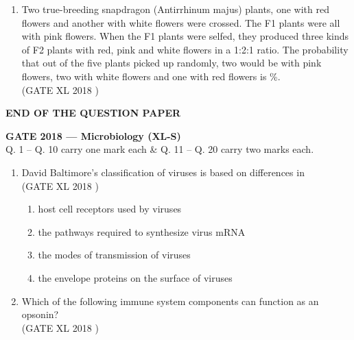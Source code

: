 \documentclass[14pt]{extarticle}
\begin{document}
\begin{flushleft}
\begin{enumerate}[leftmargin=*]
    \item Two true-breeding snapdragon (Antirrhinum majus) plants, one with red flowers and another with white flowers were crossed. The F1 plants were all with pink flowers. When the F1 plants were selfed, they produced three kinds of F2 plants with red, pink and white flowers in a 1:2:1 ratio. The probability that out of the five plants picked up randomly, two would be with pink flowers, two with white flowers and one with red flowers is \underline{\hspace{3cm}} \%.\\
    \hfill(GATE XL 2018 )
\end{enumerate}
\begin{center}
    \textbf{END OF THE QUESTION PAPER}
\end{center}
\clearpage

\begin{center}
 \textbf{\large{GATE 2018 — Microbiology (XL-S)}}\\[6pt]
 Q. 1 -- Q. 10 carry one mark each \& Q. 11 -- Q. 20 carry two marks each.\\[12pt]
\end{center}

\begin{enumerate}

\item David Baltimore’s classification of viruses is based on differences in\\
\hfill(GATE XL 2018 )\\
\begin{enumerate}
  \item host cell receptors used by viruses
  \item the pathways required to synthesize virus mRNA
  \item the modes of transmission of viruses
  \item the envelope proteins on the surface of viruses
\end{enumerate}

\item Which of the following immune system components can function as an opsonin?\\
\hfill(GATE XL 2018 )\\
\begin{enumerate}
\end{enumerate}


\end{enumerate}
\end{flushleft}
\end{document}
